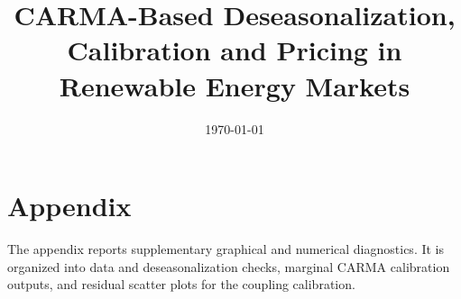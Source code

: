 \documentclass[11pt]{article}
\title{CARMA-Based Deseasonalization, Calibration and Pricing in Renewable Energy Markets}
\author{}
\date{\today}
\begin{document}
\maketitle

\begin{abstract}
\end{abstract}







\clearpage
\appendix
{}
\section*{Appendix}
The appendix reports supplementary graphical and numerical diagnostics. It is
organized into data and deseasonalization checks, marginal CARMA calibration
outputs, and residual scatter plots for the coupling calibration.





\end{document}
